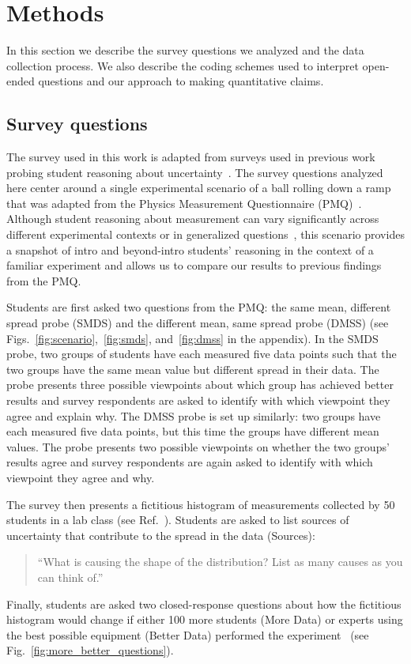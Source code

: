 \documentclass[english,aps,prstper,reprint,showpacs,longbibliography,superscriptaddress,nofootinbib]{revtex4-2}
\begin{document}
\section{Methods}

In this section we describe the survey questions we analyzed and the data collection process. We also describe the coding schemes used to interpret open-ended questions and our approach to making quantitative claims.

\subsection{Survey questions}

The survey used in this work is adapted from surveys used in previous work probing student reasoning about uncertainty~\cite{SchangTBD,StumpTBD,Allie1998}. The survey questions analyzed here center around a single experimental scenario of a ball rolling down a ramp that was adapted from the Physics Measurement Questionnaire (PMQ)~\cite{Allie1998}. Although student reasoning about measurement can vary significantly across different experimental contexts or in generalized questions~\cite{Leach2000, StumpTBD, SchangTBD}, this scenario provides a snapshot of intro and beyond-intro students' reasoning in the context of a familiar experiment and allows us to compare our results to previous findings from the PMQ.

Students are first asked two questions from the PMQ: the same mean, different spread probe (SMDS) and the different mean, same spread probe (DMSS) (see Figs.~\ref{fig:scenario},~\ref{fig:smds}, and~\ref{fig:dmss} in the appendix). In the SMDS probe, two groups of students have each measured five data points such that the two groups have the same mean value but different spread in their data. The probe presents three possible viewpoints about which group has achieved better results and survey respondents are asked to identify with which viewpoint they agree and explain why. The DMSS probe is set up similarly: two groups have each measured five data points, but this time the groups have different mean values. The probe presents two possible viewpoints on whether the two groups' results agree and survey respondents are again asked to identify with which viewpoint they agree and why.

The survey then presents a fictitious histogram of measurements collected by 50 students in a lab class (see Ref.~\cite{StumpTBD}). Students are asked to list sources of uncertainty that contribute to the spread in the data (Sources):
\begin{quote}
    ``What is causing the shape of the distribution? List as many causes as you can think of.''
\end{quote}
Finally, students are asked two closed-response questions about how the fictitious histogram would change if either 100 more students (More Data) or experts using the best possible equipment (Better Data) performed the experiment~\cite{SchangTBD} (see Fig.~\ref{fig:more_better_questions}).
\end{document}
